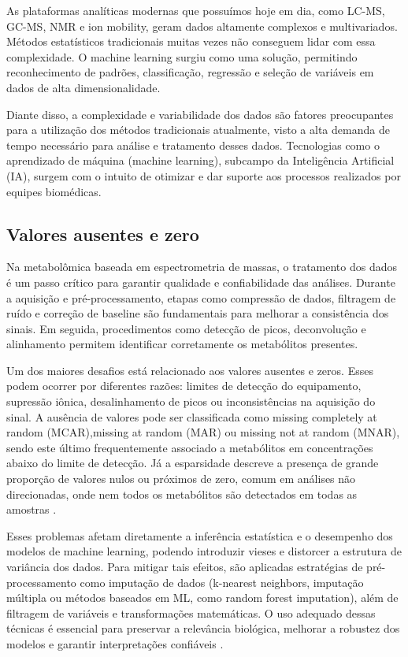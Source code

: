 As plataformas analíticas modernas que possuímos hoje em dia, como LC-MS, GC-MS, NMR e ion mobility, geram dados altamente complexos e multivariados. Métodos estatísticos tradicionais muitas vezes não conseguem lidar com essa complexidade. O machine learning surgiu como uma solução, permitindo reconhecimento de padrões, classificação, regressão e seleção de variáveis em dados de alta dimensionalidade\cite{picone2026integrating}. 

Diante disso, a complexidade e variabilidade dos dados são fatores preocupantes para a utilização dos métodos tradicionais atualmente, visto a alta demanda de tempo necessário para análise e tratamento desses dados. Tecnologias como o aprendizado de máquina (machine learning), subcampo da Inteligência Artificial (IA), surgem com o intuito de otimizar e dar suporte aos processos realizados por equipes biomédicas.


\subsection{Valores ausentes e zero}

 Na metabolômica baseada em espectrometria de massas, o tratamento dos dados é um passo crítico para garantir qualidade e confiabilidade das análises. Durante a aquisição e pré-processamento, etapas como compressão de dados, filtragem de ruído e correção de baseline são fundamentais para melhorar a consistência dos sinais. Em seguida, procedimentos como detecção de picos, deconvolução e alinhamento permitem identificar corretamente os metabólitos presentes.

Um dos maiores desafios está relacionado aos valores ausentes e zeros. Esses podem ocorrer por diferentes razões: limites de detecção do equipamento, supressão iônica, desalinhamento de picos ou inconsistências na aquisição do sinal. A ausência de valores pode ser classificada como missing completely at random (MCAR),missing at random (MAR) ou missing not at random (MNAR), sendo este último frequentemente associado a metabólitos em concentrações abaixo do limite de detecção. Já a esparsidade descreve a presença de grande proporção de valores nulos ou próximos de zero, comum em análises não direcionadas, onde nem todos os metabólitos são detectados em todas as amostras \cite{metabolomicsdatatreatment}.

Esses problemas afetam diretamente a inferência estatística e o desempenho dos modelos de machine learning, podendo introduzir vieses e distorcer a estrutura de variância dos dados. Para mitigar tais efeitos, são aplicadas estratégias de pré-processamento como imputação de dados (k-nearest neighbors, imputação múltipla ou métodos baseados em ML, como random forest imputation), além de filtragem de variáveis e transformações matemáticas. O uso adequado dessas técnicas é essencial para preservar a relevância biológica, melhorar a robustez dos modelos e garantir interpretações confiáveis \cite{metabolomicsdatatreatment}.


